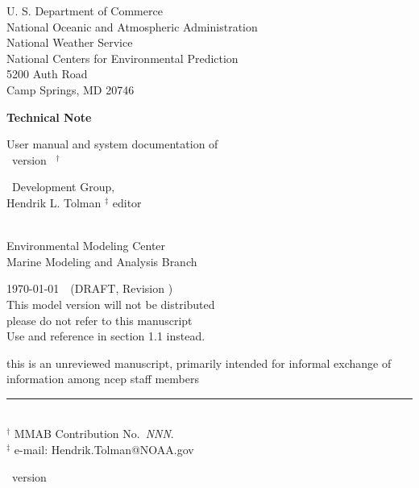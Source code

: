 
\pagestyle{empty}

\begin{center} 
U. S. Department of Commerce \\
National Oceanic and Atmospheric Administration \\
National Weather Service \\
National Centers for Environmental Prediction \\
5200 Auth Road \\
Camp Springs, MD 20746


\vspace{15mm}

{\bf Technical Note}

\vspace{15mm}

{\large User manual and system documentation of \\
\ww\ version \WWver\ $^\dag$} \\

\vspace{15mm}

\ww\ Development Group, \\
Hendrik L. Tolman $^\ddag$ editor\\
\strut \\
Environmental Modeling Center \\
Marine Modeling and Analysis Branch

\vfill

\today $\:\:\:$ (DRAFT, Revision \SVNRevision) \\
\vspace{\baselineskip}
This model version will not be distributed \\
{\sc please do not refer to this manuscript} \\
Use \cite{tol:MMAB09a} and reference in section 1.1 instead.


\vfill
{\sc this is an unreviewed manuscript, primarily intended for informal
exchange of information among ncep staff members}

\end{center}
\noindent \rule{140mm}{0.5mm} \\
{\small $^\dag$ MMAB Contribution No.~{\it NNN}. \\
$^\ddag$ e-mail: Hendrik.Tolman@NOAA.gov}

\bpage

\pb

         { \hspace{17.5mm} \ww\ version \WWver}
\pagestyle{myheadings}
\setcounter{page}{1}
\tableofcontents



\pb
\pagestyle{myheadings}

